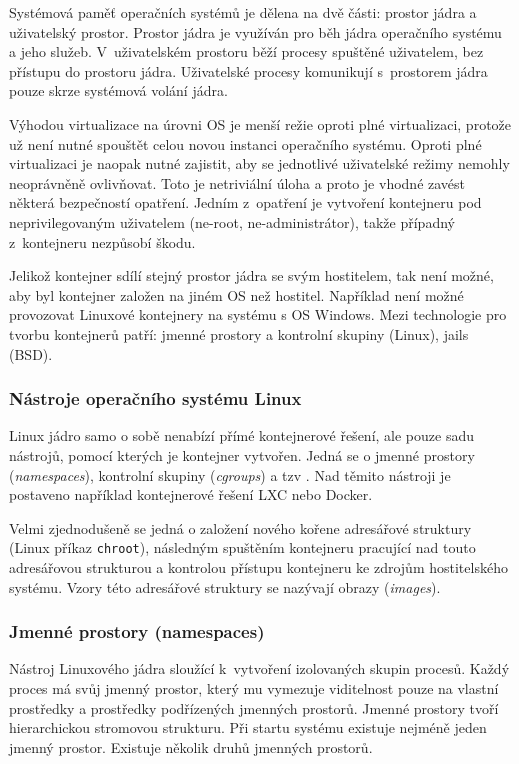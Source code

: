 Systémová paměť operačních systémů je dělena na dvě části: prostor jádra a uživatelský prostor.
Prostor jádra je využíván pro běh jádra operačního systému a jeho služeb.
V~uživatelském prostoru běží procesy spuštěné uživatelem, bez přístupu do prostoru jádra.
Uživatelské procesy komunikují s~prostorem jádra pouze skrze systémová volání jádra.
\cite{kernel_space}

Výhodou virtualizace na úrovni OS je menší režie oproti plné virtualizaci, protože už není nutné spouštět celou novou instanci operačního systému.
Oproti plné virtualizaci je naopak nutné zajistit, aby se jednotlivé uživatelské režimy nemohly neoprávněně ovlivňovat.
Toto je netriviální úloha a proto je vhodné zavést některá bezpečností opatření.
Jedním z~opatření je vytvoření kontejneru pod neprivilegovaným uživatelem (ne-root, ne-administrátor), takže případný  z~kontejneru nezpůsobí škodu.

Jelikož kontejner sdílí stejný prostor jádra se svým hostitelem, tak není možné, aby byl kontejner založen na jiném OS než hostitel.
Například není možné provozovat Linuxové kontejnery na systému s OS Windows.
Mezi technologie pro tvorbu kontejnerů patří: jmenné prostory a kontrolní skupiny (Linux), jails (BSD).

\subsubsection{Nástroje operačního systému Linux}

Linux jádro samo o sobě nenabízí přímé kontejnerové řešení, ale pouze sadu nástrojů, pomocí kterých je kontejner vytvořen.
Jedná se o jmenné prostory (\textit{namespaces}), kontrolní skupiny (\textit{cgroups}) a tzv .
Nad těmito nástroji je postaveno například kontejnerové řešení LXC nebo Docker.

Velmi zjednodušeně se jedná o založení nového kořene adresářové struktury (Linux příkaz \verb|chroot|), následným spuštěním kontejneru pracující nad touto adresářovou strukturou a kontrolou přístupu kontejneru ke zdrojům hostitelského systému.
Vzory této adresářové struktury se nazývají obrazy (\textit{images}).

\subsubsection{Jmenné prostory (namespaces)}

Nástroj Linuxového jádra sloužící k~vytvoření izolovaných skupin procesů.
Každý proces má svůj jmenný prostor, který mu vymezuje viditelnost pouze na vlastní prostředky a prostředky podřízených jmenných prostorů.
Jmenné prostory tvoří hierarchickou stromovou strukturu.
Při startu systému existuje nejméně jeden jmenný prostor.
Existuje několik druhů jmenných prostorů.

